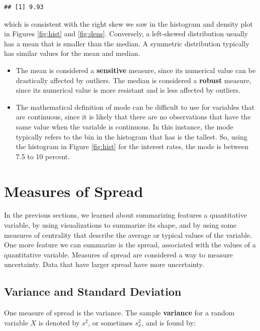 \documentclass[
]{book}
\begin{document}
\begin{verbatim}
## [1] 9.93
\end{verbatim}

which is consistent with the right skew we saw in the histogram and density plot in Figures \ref{fig:hist} and \ref{fig:dens}. Conversely, a left-skewed distribution usually has a mean that is smaller than the median. A symmetric distribution typically has similar values for the mean and median.

\begin{itemize}
\item
  The mean is considered a \textbf{sensitive} measure, since its numerical value can be drastically affected by outliers. The median is considered a \textbf{robust} measure, since its numerical value is more resistant and is less affected by outliers.
\item
  The mathematical definition of mode can be difficult to use for variables that are continuous, since it is likely that there are no observations that have the same value when the variable is continuous. In this instance, the mode typically refers to the bin in the histogram that has is the tallest. So, using the histogram in Figure \ref{fig:hist} for the interest rates, the mode is between 7.5 to 10 percent.
\end{itemize}

\hypertarget{measures-of-spread}{%
\section{Measures of Spread}\label{measures-of-spread}}

In the previous sections, we learned about summarizing features a quantitative variable, by using visualizations to summarize its shape, and by using some measures of centrality that describe the average or typical values of the variable. One more feature we can summarize is the spread, associated with the values of a quantitative variable. Measures of spread are considered a way to measure uncertainty. Data that have larger spread have more uncertainty.

\hypertarget{variance-and-standard-deviation}{%
\subsection{Variance and Standard Deviation}\label{variance-and-standard-deviation}}

One measure of spread is the variance. The sample \textbf{variance} for a random variable \(X\) is denoted by \(s^2\), or sometimes \(s_x^2\), and is found by:
\end{document}
